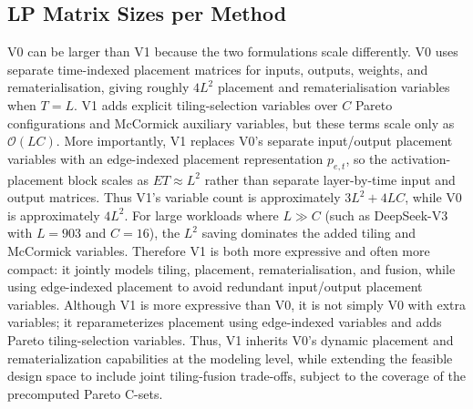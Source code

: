 \subsection{LP Matrix Sizes per Method}\label{append::lp_size}
V0 can be larger than V1 because the two formulations scale differently.
V0 uses separate time-indexed placement matrices for inputs, outputs,
weights, and rematerialisation, giving roughly $4L^2$ placement and
rematerialisation variables when $T = L$.
V1 adds explicit tiling-selection variables over $C$ Pareto configurations
and McCormick auxiliary variables, but these terms scale only as
$\mathcal{O}(LC)$.
More importantly, V1 replaces V0's separate input/output placement
variables with an edge-indexed placement representation $p_{e,t}$, so the
activation-placement block scales as $ET \approx L^2$ rather than separate
layer-by-time input and output matrices.
Thus V1's variable count is approximately $3L^2 + 4LC$, while V0 is
approximately $4L^2$.
For large workloads where $L \gg C$ (such as DeepSeek-V3 with $L = 903$
and $C = 16$), the $L^2$ saving dominates the added tiling and McCormick
variables.
Therefore V1 is both more expressive and often more compact: it jointly
models tiling, placement, rematerialisation, and fusion, while using
edge-indexed placement to avoid redundant input/output placement variables. Although V1 is more expressive than V0, it is not simply V0 with extra variables; it reparameterizes placement using edge-indexed variables and adds Pareto tiling-selection variables. Thus, V1 inherits V0’s dynamic placement and rematerialization capabilities at the modeling level, while extending the feasible design space to include joint tiling-fusion trade-offs, subject to the coverage of the precomputed Pareto C-sets.

